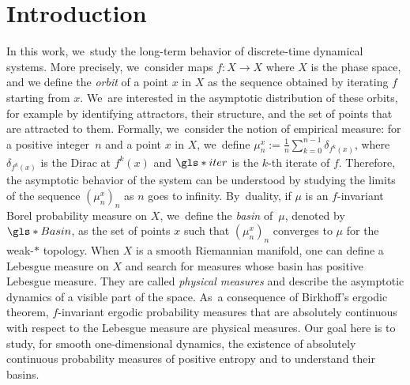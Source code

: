 \documentclass[JEP,XML,SOM,Unicode,NoFloatCountersInSection,published]{cedram}
\theoremstyle{definition}
\begin{document}
\section{Introduction}
\label{sec:intro}

In this work, we~study the long-term behavior of discrete-time dynamical systems.
More precisely, we~consider maps $f : X \to X$ where $X$ is the phase space,
and we define the \textit{orbit} of a point $x$ in $X$ as the sequence obtained by iterating $f$ starting from $x$. We~are interested in the asymptotic distribution of these orbits, for \hbox{example} by identifying attractors, their structure, and the set of points that are attracted to them.
Formally, we~consider the notion of empirical measure: for a positive integer~$n$ and a point $x$ in $X$, we~define $\mu_n^x := \frac{1}{n} \sum_{k=0}^{n-1} \delta_{f^k(x)}$, where $\delta_{f^k(x)}$ is the Dirac at $f^k(x)$ and $\gls*{iter}$ is the $k$-th iterate of $f$.
Therefore, the asymptotic behavior of the system can be understood by studying the limits of the sequence $(\mu_n^x)_{n}$ as $n$ goes to infinity. By~duality, if $\mu$ is an $f$\nobreakdash-invariant Borel probability measure on $X$, we~define the \textit{basin} of~$\mu$, denoted by $\gls*{Basin}$, as the set of points $x$ such that $\left (\mu_n^x \right)_n$ converges to $\mu$ for the weak\nobreakdash-$*$ topology.
When $X$ is a smooth Riemannian manifold, one can define a Lebesgue measure on $X$ and search for measures whose basin has positive Lebesgue measure. They are called \textit{physical measures} and describe the asymptotic dynamics of a visible part of the space. As~a consequence of Birkhoff's ergodic theorem, $f$\nobreakdash-invariant ergodic probability measures that are absolutely continuous with respect to the Lebesgue measure are physical measures.
Our goal here is to study, for smooth one-dimensional dynamics, the existence of absolutely continuous probability measures of positive entropy and to understand their basins.
\end{document}
